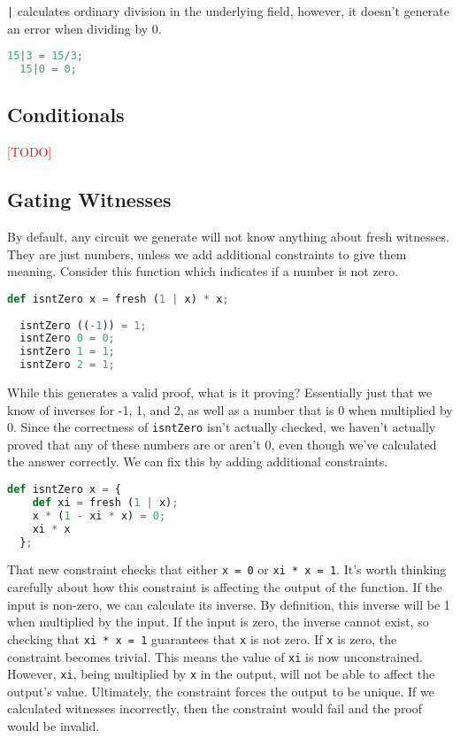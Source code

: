\lstinline{|} calculates ordinary division in the underlying field, however, it doesn't generate an error when dividing by 0.

\begin{lstlisting}[language=Python]
  15|3 = 15/3;
  15|0 = 0;
\end{lstlisting}










\subsection{Conditionals}

\textcolor{red}{[TODO]}






\subsection{Gating Witnesses} \label{GW}

By default, any circuit we generate will not know anything about fresh witnesses. They are just numbers, unless we add additional constraints to give them meaning. Consider this function which indicates if a number is not zero.

\begin{lstlisting}[language=Python]
  def isntZero x = fresh (1 | x) * x;
  
  isntZero ((-1)) = 1;
  isntZero 0 = 0;
  isntZero 1 = 1;
  isntZero 2 = 1;
\end{lstlisting}

While this generates a valid proof, what is it proving? Essentially just that we know of inverses for -1, 1, and 2, as well as a number that is 0 when multiplied by 0. Since the correctness of \lstinline{isntZero} isn't actually checked, we haven't actually proved that any of these numbers are or aren't 0, even though we've calculated the answer correctly. We can fix this by adding additional constraints.

\begin{lstlisting}[language=Python]
  def isntZero x = {
    def xi = fresh (1 | x);
    x * (1 - xi * x) = 0;
    xi * x
  };
\end{lstlisting}

That new constraint checks that either \lstinline{x = 0} or \lstinline{xi * x = 1}. It's worth thinking carefully about how this constraint is affecting the output of the function. If the input is non-zero, we can calculate its inverse. By definition, this inverse will be 1 when multiplied by the input. If the input is zero, the inverse cannot exist, so checking that \lstinline{xi * x = 1} guarantees that \lstinline{x} is not zero. If \lstinline{x} is zero, the constraint becomes trivial. This means the value of \lstinline{xi} is now unconstrained. However, \lstinline{xi}, being multiplied by \lstinline{x} in the output, will not be able to affect the output's value. Ultimately, the constraint forces the output to be unique. If we calculated witnesses incorrectly, then the constraint would fail and the proof would be invalid.

